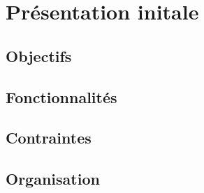 \section{Présentation initale}
\subsection{Objectifs}
\subsection{Fonctionnalités}
\subsection{Contraintes}
\subsection{Organisation}